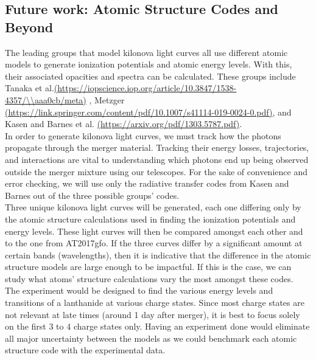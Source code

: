 \documentclass[11pt,a4paper]{article}
\begin{document}
\subsection{Future work: Atomic Structure Codes and Beyond}

The leading groups that model kilonova light curves all use different atomic models to generate ionization potentials and atomic energy levels. With this, their associated opacities and spectra can be calculated.  These groups include Tanaka et al.\url{(https://iopscience.iop.org/article/10.3847/1538-4357/\\aaa0cb/meta)} , Metzger \url{(https://link.springer.com/content/pdf/10.1007/s41114-019-0024-0.pdf)}, and Kasen and Barnes et al. \url{(https://arxiv.org/pdf/1303.5787.pdf)}. \\

In order to generate kilonova light curves, we must track how the photons propagate through the merger material. Tracking their energy losses, trajectories, and interactions are vital to understanding which photons end up being observed outside the merger mixture using our telescopes. For the sake of convenience and error checking, we will use only the radiative transfer codes from Kasen and Barnes out of the three possible groups' codes.\\

Three unique kilonova light curves will be generated, each one differing only by the atomic structure calculations used in finding the ionization potentials and energy levels. These light curves will then be compared amongst each other and to the one from AT2017gfo. If the three curves differ by a significant amount at certain bands (wavelengths), then it is indicative that the difference in the atomic structure models are large enough to be impactful. If this is the case, we can study what atoms' structure calculations vary the most amongst these codes.\\  

The experiment would be designed to find the various energy levels and transitions of a lanthanide at various charge states. Since most charge states are not relevant at late times (around 1 day after merger), it is best to focus solely on the first 3 to 4 charge states only. Having an experiment done would eliminate all major uncertainty between the models as we could benchmark each atomic structure code with the experimental data.




\end{document}
